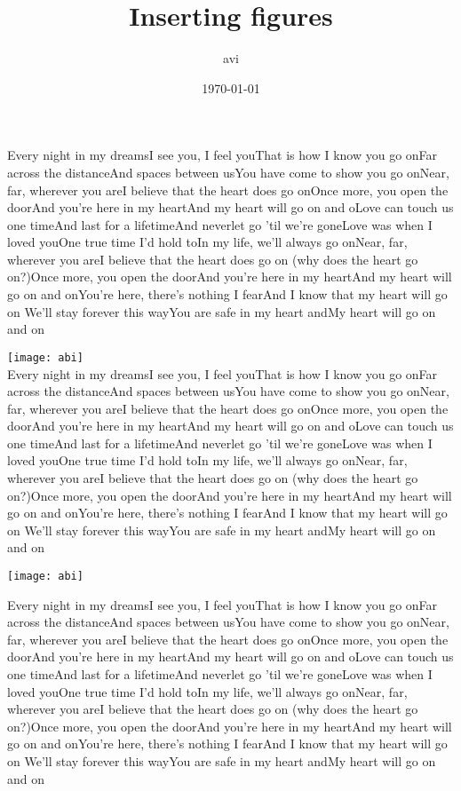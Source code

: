 \documentclass[12pt]{report}
\title{Inserting figures}
\author{avi}
\date{\today}
\begin{document}
\maketitle

\tableofcontents
\listoffigures
\pagebreak
Every night in my dreamsI see you, I feel youThat is how I know you go onFar across the distanceAnd spaces between usYou have come to show you go onNear, far, wherever you areI believe that the heart does go onOnce more, you open the doorAnd you're here in my heartAnd my heart will go on and oLove can touch us one timeAnd last for a lifetimeAnd neverlet go 'til we're goneLove was when I loved youOne true time I'd hold toIn my life, we'll always go onNear, far, wherever you areI believe that the heart does go on (why does the heart go on?)Once more, you open the doorAnd you're here in my heartAnd my heart will go on and onYou're here, there's nothing I fearAnd I know that my heart will go on We'll stay forever this wayYou are safe in my heart andMy heart will go on and on
\vspace{1cm}

\texttt{[image: abi]}\\

Every night in my dreamsI see you, I feel youThat is how I know you go onFar across the distanceAnd spaces between usYou have come to show you go onNear, far, wherever you areI believe that the heart does go onOnce more, you open the doorAnd you're here in my heartAnd my heart will go on and oLove can touch us one timeAnd last for a lifetimeAnd neverlet go 'til we're goneLove was when I loved youOne true time I'd hold toIn my life, we'll always go onNear, far, wherever you areI believe that the heart does go on (why does the heart go on?)Once more, you open the doorAnd you're here in my heartAnd my heart will go on and onYou're here, there's nothing I fearAnd I know that my heart will go on We'll stay forever this wayYou are safe in my heart andMy heart will go on and on

\vspace{1cm}

\centering
\texttt{[image: abi]}

Every night in my dreamsI see you, I feel youThat is how I know you go onFar across the distanceAnd spaces between usYou have come to show you go onNear, far, wherever you areI believe that the heart does go onOnce more, you open the doorAnd you're here in my heartAnd my heart will go on and oLove can touch us one timeAnd last for a lifetimeAnd neverlet go 'til we're goneLove was when I loved youOne true time I'd hold toIn my life, we'll always go onNear, far, wherever you areI believe that the heart does go on (why does the heart go on?)Once more, you open the doorAnd you're here in my heartAnd my heart will go on and onYou're here, there's nothing I fearAnd I know that my heart will go on We'll stay forever this wayYou are safe in my heart andMy heart will go on and on
\end{document}
